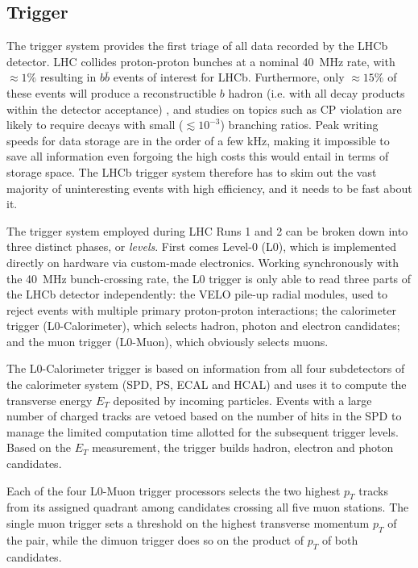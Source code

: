 \subsection{Trigger}
The trigger system \cite{Antunes-Nobrega:630828} provides the first triage of all data recorded by the LHCb detector.
LHC collides proton-proton bunches at a nominal \SI{40}{\mega\hertz} rate, with $\approx 1\%$ resulting in $b\bar{b}$ events of interest for LHCb.
Furthermore, only $\approx 15\%$ of these events will produce a reconstructible $b$ hadron (i.e. with all decay products within the detector acceptance) \cite{HistoryLHCb}, and studies on topics such as CP violation are likely to require decays with small ($\lesssim {10}^{-3}$) branching ratios.
Peak writing speeds for data storage are in the order of a few \si{\kilo\hertz}, making it impossible to save all information even forgoing the high costs this would entail in terms of storage space.
The LHCb trigger system therefore has to skim out the vast majority of uninteresting events with high efficiency, and it needs to be fast about it.

The trigger system employed during LHC Runs 1 and 2 can be broken down into three distinct phases, or \textit{levels}.
First comes Level-0 (L0), which is implemented directly on hardware via custom-made electronics.
Working synchronously with the \SI{40}{\mega\hertz} bunch-crossing rate, the L0 trigger is only able to read three parts of the LHCb detector independently: the VELO pile-up radial modules, used to reject events with multiple primary proton-proton interactions; the calorimeter trigger (L0-Calorimeter), which selects hadron, photon and electron candidates; and the muon trigger (L0-Muon), which obviously selects muons.

The L0-Calorimeter trigger is based on information from all four subdetectors of the calorimeter system (SPD, PS, ECAL and HCAL) and uses it to compute the transverse energy $E_T$ deposited by incoming particles.
Events with a large number of charged tracks are vetoed based on the number of hits in the SPD to manage the limited computation time allotted for the subsequent trigger levels.
Based on the $E_T$ measurement, the trigger builds hadron, electron and photon candidates.

Each of the four L0-Muon trigger processors selects the two highest $p_T$ tracks from its assigned quadrant among candidates crossing all five muon stations.
The single muon trigger sets a threshold on the highest transverse momentum $p_T$ of the pair, while the dimuon trigger does so on the product of $p_T$ of both candidates.

